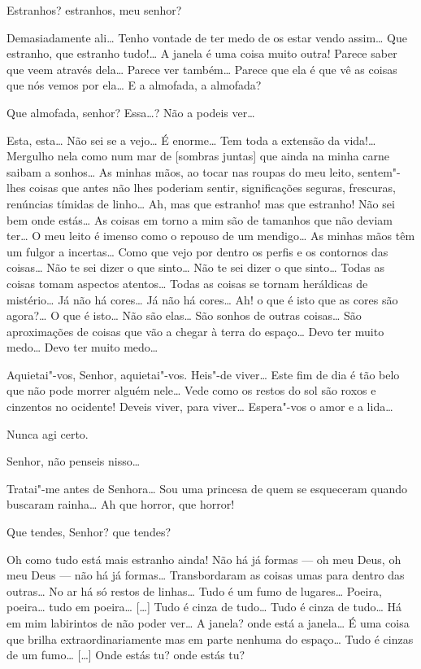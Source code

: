  Estranhos? estranhos, meu senhor?

 Demasiadamente ali\ldots{} Tenho vontade de ter medo de os
estar vendo assim\ldots{} Que estranho, que estranho tudo!\ldots{} A janela é
uma coisa muito outra! Parece saber que veem através dela\ldots{} Parece
ver também\ldots{} Parece que ela é que vê as coisas que nós vemos por
ela\ldots{} E a almofada, a almofada?

 Que almofada, senhor? Essa\ldots{}? Não a podeis ver\ldots{}

 Esta, esta\ldots{} Não sei se a vejo\ldots{} É enorme\ldots{} Tem toda a
extensão da vida!\ldots{} Mergulho nela como num mar de [sombras juntas]
que ainda na minha carne saibam a sonhos\ldots{} As minhas mãos, ao tocar
nas roupas do meu leito, sentem"-lhes coisas que antes não lhes
poderiam sentir, significações seguras, frescuras, renúncias tímidas
de linho\ldots{} Ah, mas que estranho! mas que estranho! Não sei bem onde
estás\ldots{} As coisas em torno a mim são de tamanhos que não deviam
ter\ldots{} O meu leito é imenso como o repouso de um mendigo\ldots{} As minhas
mãos têm um fulgor a incertas\ldots{} Como que vejo por dentro os perfis e
os contornos das coisas\ldots{} Não te sei dizer o que sinto\ldots{} Não te sei
dizer o que sinto\ldots{} Todas as coisas tomam aspectos atentos\ldots{} Todas
as coisas se tornam heráldicas de mistério\ldots{} Já não há cores\ldots{} Já
não há cores\ldots{} Ah! o que é isto que as cores são agora?\ldots{} O que é
isto\ldots{} Não são elas\ldots{} São sonhos de outras coisas\ldots{} São
aproximações de coisas que vão a chegar à terra do espaço\ldots{} Devo ter
muito medo\ldots{} Devo ter muito medo\ldots{}

 Aquietai"-vos, Senhor, aquietai"-vos. Heis"-de viver\ldots{} Este fim de
dia é tão belo que não pode morrer alguém nele\ldots{} Vede como os restos
do sol são roxos e cinzentos no ocidente! Deveis viver, para viver\ldots{}
Espera"-vos o amor e a lida\ldots{}

 Nunca agi certo.

 Senhor, não penseis nisso\ldots{}

 Tratai"-me antes de Senhora\ldots{} Sou uma princesa de quem se
esqueceram quando buscaram rainha\ldots{} Ah que horror, que horror! 

 Que tendes, Senhor? que tendes?

 Oh como tudo está mais estranho ainda! Não há já formas
--- oh meu Deus, oh meu Deus --- não há já formas\ldots{} Transbordaram as
coisas umas para dentro das outras\ldots{} No ar há só restos de linhas\ldots{}
Tudo é um fumo de lugares\ldots{} Poeira, poeira\ldots{} tudo em poeira\ldots{}
[\ldots{}] Tudo é cinza de tudo\ldots{} Tudo é cinza de tudo\ldots{} Há em mim
labirintos de não poder ver\ldots{} A janela? onde está a janela\ldots{} É uma
coisa que brilha extraordinariamente mas em parte nenhuma do
espaço\ldots{} Tudo é cinzas de um fumo\ldots{} [\ldots{}] Onde estás tu? onde estás
tu?

